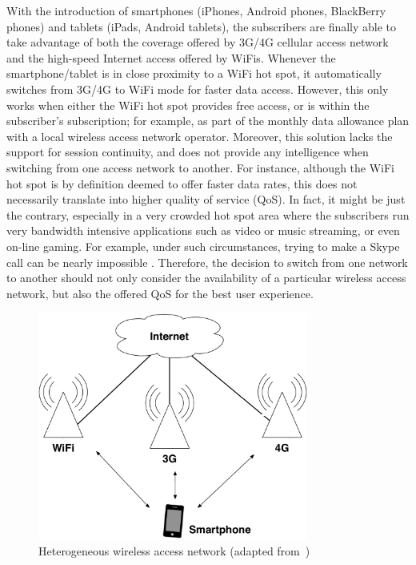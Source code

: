 With the introduction of smartphones (iPhones, Android phones, BlackBerry phones) and tablets (iPads, Android tablets), the subscribers are finally able to take advantage of both the coverage offered by 3G/4G cellular access network and the high-speed Internet access offered by WiFis. Whenever the smartphone/tablet is in close proximity to a WiFi hot spot, it automatically switches from 3G/4G to WiFi mode for faster data access. However, this only works when either the WiFi hot spot provides free access, or is within the subscriber's subscription; for example, as part of the monthly data allowance plan with a local wireless access network operator. Moreover, this solution lacks the support for session continuity, and does not provide any intelligence when switching from one access network to another. For instance, although the WiFi hot spot is by definition deemed to offer faster data rates, this does not necessarily translate into higher quality of service (QoS). In fact, it might be just the contrary, especially in a very crowded hot spot area where the subscribers run very bandwidth intensive applications such as video or music streaming, or even on-line gaming. For example, under such circumstances, trying to make a Skype call can be nearly impossible \cite{Wisely4gWLAN09}. Therefore, the decision to switch from one network to another should not only consider the availability of a particular wireless access network, but also the offered QoS for the best user experience.

\begin{figure}[t]
    \centering
    \includegraphics[width=3.5in]{Intelligent/Figures/heterogeneous}
    \caption{Heterogeneous wireless access network (adapted from~\cite{HossainBeaubrun09})}
    \label{fig:heterogeneous_intelligent}
\end{figure}

